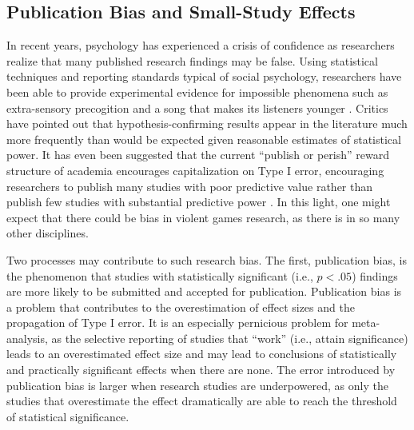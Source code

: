 \documentclass[man]{apa6}
\begin{document}
\subsection{Publication Bias and Small-Study Effects}
In recent years, psychology has experienced a crisis of confidence as researchers realize that many published research findings may be false. Using statistical techniques and reporting standards typical of social psychology, researchers have been able to provide experimental evidence for impossible phenomena such as extra-sensory precogition \citep[psi][]{Bem:2011} and a song that makes its listeners younger \citep{Simmons:etal:2011}. Critics have pointed out that hypothesis-confirming results appear in the literature much more frequently than would be expected given reasonable estimates of statistical power. %
It has even been suggested that the current ``publish or perish'' reward structure of academia encourages capitalization on Type I error, encouraging researchers to publish many studies with poor predictive value rather than publish few studies with substantial predictive power \citep{Bakker:etal:2011}. In this light, one might expect that there could be bias in violent games research, as there is in so many other disciplines. 

Two processes may contribute to such research bias. The first, publication bias, is the phenomenon that studies with statistically significant (i.e., $p<.05$) findings are more likely to be submitted and accepted for publication. Publication bias is a problem that contributes to the overestimation of effect sizes and the propagation of Type I error. It is an especially pernicious problem for meta-analysis, as the selective reporting of studies that ``work'' (i.e., attain significance) leads to an overestimated effect size and may lead to conclusions of statistically and practically significant effects when there are none. The error introduced by publication bias is larger when research studies are underpowered, as only the studies that overestimate the effect dramatically are able to reach the threshold of statistical significance.
\end{document}
